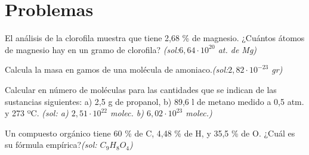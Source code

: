 \section{Problemas}
\begin{multicols}{2}

\begin{problem}
El análisis de la clorofila muestra que tiene 2,68 \% de magnesio. ¿Cuántos átomos de magnesio hay en un gramo de clorofila? \textit{\scriptsize(sol:$6,64\cdot10^{20}$ at. de Mg)}
\end{problem}
\begin{problem}
Calcula la masa en gamos de una molécula de amoniaco.\textit{\scriptsize(sol:$2,82\cdot10^{-23}$ gr)}
\end{problem}
\begin{problem}
Calcular en número de moléculas para las cantidades que se indican de las sustancias siguientes: a) 2,5 g de propanol, b) 89,6 l de metano medido a 0,5 atm. y 273 ºC. \textit{\scriptsize(sol: a) $2,51\cdot10^{22}$ molec. b) $6,02\cdot10^{23}$ molec.)}
\end{problem}
\begin{problem}
Un compuesto orgánico tiene 60 \% de C, 4,48 \% de H, y 35,5 \% de O. ¿Cuál es su fórmula empírica?\textit{\scriptsize(sol: $C_9H_8O_4$)}


\end{problem}
\end{multicols}
